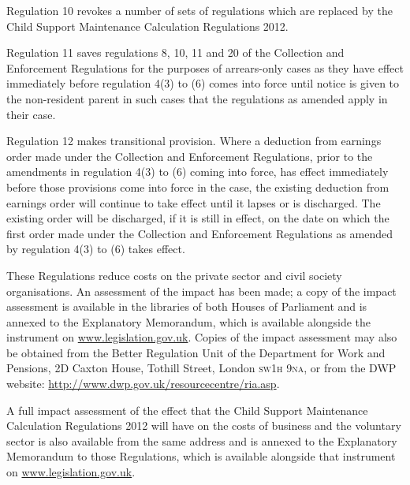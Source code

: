 \documentclass[12pt,a4paper]{article}
\begin{document}
Regulation 10 revokes a number of sets of regulations which are replaced by the Child Support Maintenance Calculation Regulations 2012.

Regulation 11 saves regulations 8, 10, 11 and 20 of the Collection and Enforcement Regulations for the purposes of arrears-only cases as they have effect immediately before regulation 4(3) to (6) comes into force until notice is given to the non-resident parent in such cases that the regulations as amended apply in their case.

Regulation 12 makes transitional provision. Where a deduction from earnings order made under the Collection and Enforcement Regulations, prior to the amendments in regulation 4(3) to (6) coming into force, has effect immediately before those provisions come into force in the case, the existing deduction from earnings order will continue to take effect until it lapses or is discharged. The existing order will be discharged, if it is still in effect, on the date on which the first order made under the Collection and Enforcement Regulations as amended by regulation 4(3) to (6) takes effect.

These Regulations reduce costs on the private sector and civil society organisations. An assessment of the impact has been made; a copy of the impact assessment is available in the libraries of both Houses of Parliament and is annexed to the Explanatory Memorandum, which is available alongside the instrument on \url{www.legislation.gov.uk}. Copies of the impact assessment may also be obtained from the Better Regulation Unit of the Department for Work and Pensions, 2D Caxton House, Tothill Street, London \textsc{\lowercase{SW1H 9NA}}, or from the DWP website: \url{http://www.dwp.gov.uk/resourcecentre/ria.asp}.

A full impact assessment of the effect that the Child Support Maintenance Calculation Regulations 2012 will have on the costs of business and the voluntary sector is also available from the same address and is annexed to the Explanatory Memorandum to those Regulations, which is available alongside that instrument on \url{www.legislation.gov.uk}. 
\end{document}
